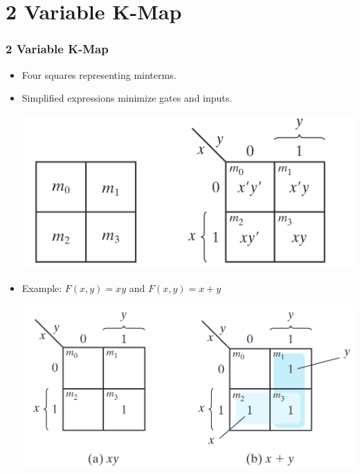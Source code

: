 \documentclass[Serif, 10pt, brown]{beamer}
\theoremstyle{example}
\theoremstyle{plain}
\begin{document}
\section[2 Variable K-Map]{2 Variable K-Map}
\begin{frame}
	\frametitle{2 Variable K-Map}
	\transfly
	\begin{itemize}
        \item Four squares representing minterms.
        
        \item Simplified expressions minimize gates and inputs.
        \begin{center}
        \includegraphics[width=0.5\linewidth]{figs/2var.png}
    \end{center}
    \item Example: \( F(x,y) = xy \)  and \( F(x,y) = x+y \)
    \begin{center}
        \includegraphics[width=0.5\linewidth]{figs/2ex.png}
    \end{center}
    \end{itemize}
    
	

\end{frame}
\end{document}
